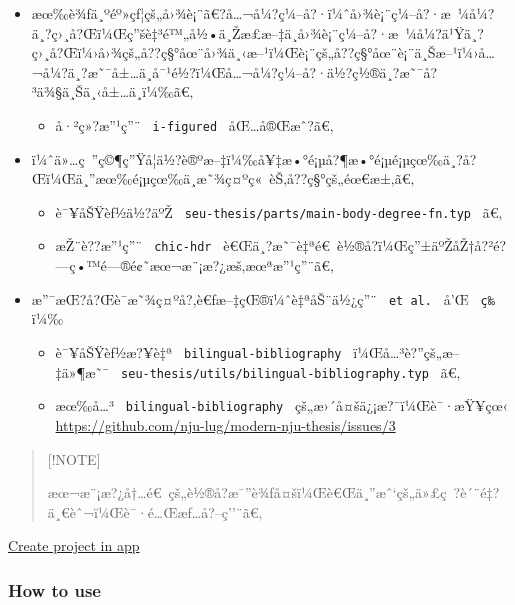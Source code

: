 \begin{itemize}
\item
  æœ‰è¾ƒä¸ºéº»çƒ¦çš„å›¾è¡¨ã€?å\ldots¬å¼?ç¼--å?·ï¼ˆå›¾è¡¨ç¼--å?·æ~¼å¼?ä¸?ç›¸å?Œï¼Œç''šè‡³é™„å½•ä¸Žæ­£æ--‡ä¸­å›¾è¡¨ç¼--å?·æ~¼å¼?ä¹Ÿä¸?ç›¸å?Œï¼›å›¾çš„å??ç§°åœ¨å›¾ä¸‹æ--¹ï¼Œè¡¨çš„å??ç§°åœ¨è¡¨ä¸Šæ--¹ï¼›å\ldots¬å¼?ä¸?æ˜¯å±\ldots ä¸­å¯¹é½?ï¼Œå\ldots¬å¼?ç¼--å?·ä½?ç½®ä¸?æ˜¯å?³ä¾§ä¸Šä¸‹å±\ldots ä¸­ï¼‰ã€‚

  \begin{itemize}
  \tightlist
  \item
    å·²ç»?æ''¹ç''¨ \texttt{\ i-figured\ } åŒ\ldots å®Œæˆ?ã€‚
  \end{itemize}
\item
  ï¼ˆä»\ldots ç~''ç©¶ç''Ÿå­¦ä½?è®ºæ--‡ï¼‰å¥‡æ•°é¡µå?¶æ•°é¡µé¡µçœ‰ä¸?å?Œï¼Œä¸''æœ‰é¡µçœ‰ä¸­æ˜¾ç¤ºç«~èŠ‚å??ç§°çš„éœ€æ±‚ã€‚

  \begin{itemize}
  \tightlist
  \item
    è¯¥åŠŸèƒ½ä½?äºŽ
    \texttt{\ seu-thesis/parts/main-body-degree-fn.typ\ } ã€‚
  \item
    æŽ¨è??æ''¹ç''¨ \texttt{\ chic-hdr\ }
    è€Œä¸?æ˜¯è‡ªé€~è½®å­?ï¼Œç''±äºŽåŽ†å?²é?---ç•™é---®é¢˜æœ¬æ¨¡æ?¿æš‚æœªæ''¹ç''¨ã€‚
  \end{itemize}
\item
  æ''¯æŒ?å?Œè¯­æ˜¾ç¤ºå?‚è€ƒæ--‡çŒ®ï¼ˆè‡ªåŠ¨ä½¿ç''¨ \texttt{\ et\ al.\ }
  å'Œ \texttt{\ ç­‰\ } ï¼‰

  \begin{itemize}
  \tightlist
  \item
    è¯¥åŠŸèƒ½æ?¥è‡ª \texttt{\ bilingual-bibliography\ }
    ï¼Œå\ldots³è?''çš„æ--‡ä»¶æ˜¯
    \texttt{\ seu-thesis/utils/bilingual-bibliography.typ\ } ã€‚
  \item
    æœ‰å\ldots³ \texttt{\ bilingual-bibliography\ }
    çš„æ›´å¤šä¿¡æ?¯ï¼Œè¯·æŸ¥çœ‹
    \url{https://github.com/nju-lug/modern-nju-thesis/issues/3}
  \end{itemize}
\end{itemize}

\begin{quote}
{[}!NOTE{]}

æœ¬æ¨¡æ?¿å†\ldots é€~çš„è½®å­?æ¯''è¾ƒå¤šï¼Œè€Œä¸''æˆ`çš„ä»£ç~?è´¨é‡?ä¸€èˆ¬ï¼Œè¯·é\ldots Œæƒ\ldots å?--ç''¨ã€‚
\end{quote}

\href{/app?template=cheda-seu-thesis&version=0.3.0}{Create project in
app}

\subsubsection{How to use}\label{how-to-use}

